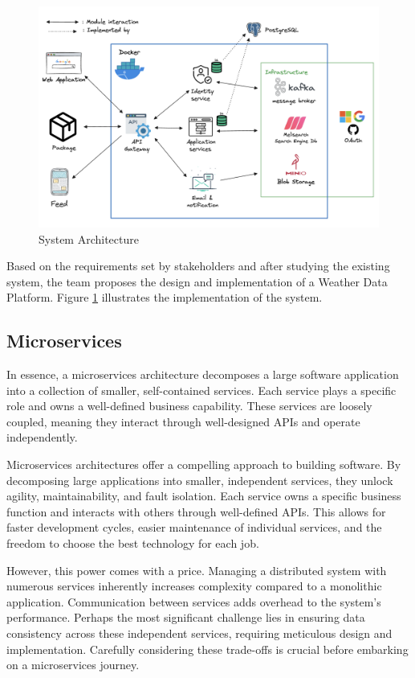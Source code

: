 \begin{figure}[H]
    \centering
    \includegraphics[width=\linewidth]{Images/arch.png}
    \vspace{1em}
    \caption{System Architecture}
    \label{fig:sow}
\end{figure}
\vspace{0.5cm}
Based on the requirements set by stakeholders and after studying the existing
system, the team proposes the design and implementation of a Weather Data Platform. Figure
\ref{fig:sow} illustrates the implementation of the system.
\newpage

\subsection{Microservices}

In essence, a microservices architecture decomposes a large software application
into a collection of smaller, self-contained services. Each service plays a
specific role and owns a well-defined business capability. These services are
loosely coupled, meaning they interact through well-designed APIs and operate independently.

Microservices architectures offer a compelling approach to building software. By
decomposing large applications into smaller, independent services, they unlock
agility, maintainability, and fault isolation.  Each service owns a specific
business function and interacts with others through well-defined APIs. This
allows for faster development cycles, easier maintenance of individual services,
and the freedom to choose the best technology for each job.

However, this power comes with a price. Managing a distributed system with
numerous services inherently increases complexity compared to a monolithic
application. Communication between services adds overhead to the system's
performance. Perhaps the most significant challenge lies in ensuring data
consistency across these independent services, requiring meticulous design and
implementation.  Carefully considering these trade-offs is crucial before
embarking on a microservices journey.

